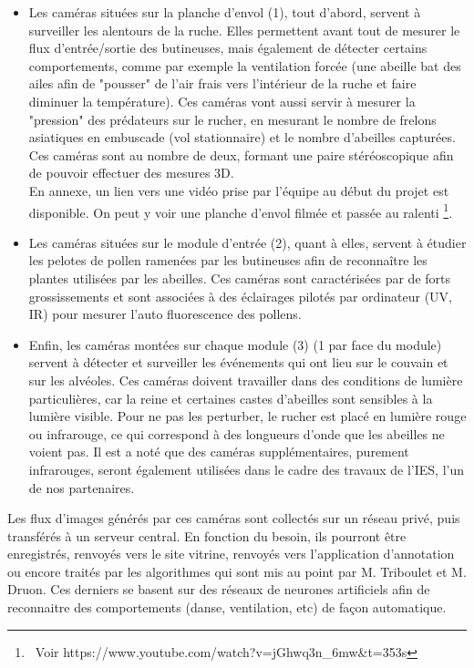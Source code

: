 \documentclass[11pt,french,a4paper]{report}
\begin{document}
\begin{itemize}
  \item Les caméras situées sur la planche d'envol (1), tout d'abord, servent à surveiller 
  les alentours de la ruche. Elles permettent avant tout de
  mesurer le flux d'entrée/sortie des butineuses, mais également de détecter
  certains comportements, comme par exemple la ventilation forcée (une abeille
  bat des ailes afin de "pousser" de l'air frais vers l'intérieur de la ruche et faire
  diminuer la température). Ces caméras vont aussi servir à mesurer la
  "pression" des prédateurs sur le rucher, en mesurant le nombre de frelons
  asiatiques en embuscade (vol stationnaire) et le nombre d'abeilles
  capturées. Ces caméras sont au nombre de deux, formant une paire
  stéréoscopique afin de pouvoir effectuer des mesures 3D. \\
  En annexe, un lien vers une vidéo prise par l'équipe au début du projet est disponible. 
        On peut y voir une planche d'envol filmée et passée au ralenti \footnote{ Voir https://www.youtube.com/watch?v=jGhwq3n\_6mw&t=353s}. \\ 
 
  \item Les caméras situées sur le module d'entrée (2), quant à elles, servent à étudier
  les pelotes de pollen ramenées par les butineuses afin de reconnaître les
  plantes utilisées par les abeilles. Ces caméras sont caractérisées par de
  forts grossissements et sont associées à des éclairages pilotés par ordinateur
  (UV, IR) pour mesurer l'auto fluorescence des pollens.

  \item Enfin, les caméras montées sur chaque module (3) (1 par face du module) servent
  à détecter et surveiller les événements qui ont lieu sur le couvain et sur
  les alvéoles. Ces caméras doivent travailler dans des conditions de lumière
  particulières, car la reine et certaines castes d'abeilles sont sensibles à
  la lumière visible. Pour ne pas les perturber, le rucher est placé en
  lumière rouge ou infrarouge, ce qui correspond à des longueurs d'onde que les
  abeilles ne voient pas. Il est a noté que des caméras supplémentaires,
  purement infrarouges, seront également utilisées dans le cadre des travaux de
  l'IES, l'un de nos partenaires.
\end{itemize}

  Les flux d'images générés par ces caméras sont collectés sur un réseau privé,
  puis transférés à un serveur central. En fonction du besoin, ils pourront
  être enregistrés, renvoyés vers le site vitrine, renvoyés vers l'application d'annotation
  ou encore traités par les algorithmes qui sont mis au point par M. Triboulet et M. Druon. 
  Ces derniers se basent sur des réseaux de neurones artificiels afin de reconnaitre des comportements
  (danse, ventilation, etc) de façon automatique. \\
\end{document}
